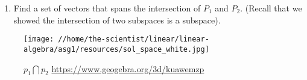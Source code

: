 \documentclass[12pt]{article}
\begin{document}
\begin{enumerate}
\begin{enumerate}
                      \item Find a set of vectors that spans the intersection of $P_1$ and $P_2$. (Recall that we showed the intersection of two subspaces is a subspace).
              \end{enumerate}
              \begin{figure}[htbp]
                      \centering
                      \texttt{[image: //home/the-scientist/linear/linear-algebra/asg1/resources/sol\_space\_white.jpg]}
                      \caption{$p_{1} \bigcap p_{2}$ \url{https://www.geogebra.org/3d/kuawemzp}\label{fig:solution space}}
              \end{figure}
\end{enumerate}
\end{document}
